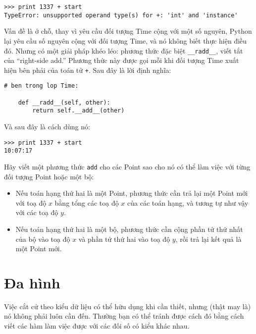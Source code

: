 \documentclass[11pt]{book}
\begin{document}

\beforeverb
\begin{verbatim}
>>> print 1337 + start
TypeError: unsupported operand type(s) for +: 'int' and 'instance'
\end{verbatim}
\afterverb
%
Vấn đề là ở chỗ, thay vì yêu cầu đối tượng  Time cộng với một số nguyên,
Python lại yêu cầu số nguyên cộng với đối tượng Time, và nó không biết 
thực hiện điều đó. Nhưng có một giải pháp khéo léo: 
phương thức đặc biệt \verb"__radd__", viết tắt của ``right-side add.''
Phương thức này được gọi mỗi khi đối tượng Time xuất hiện bên phải
của toán tử {\tt +}. Sau đây là lời định nghĩa:


\beforeverb
\begin{verbatim}
# ben trong lop Time:

    def __radd__(self, other):
        return self.__add__(other)
\end{verbatim}
\afterverb
%
Và sau đây là cách dùng nó:

\beforeverb
\begin{verbatim}
>>> print 1337 + start
10:07:17
\end{verbatim}
\afterverb
%

\begin{ex}
Hãy viết một phương thức {\tt add} cho các Point sao cho nó có thể làm
việc với từng đối tượng Point hoặc một bộ:  

\begin{itemize}

\item Nếu toán hạng thứ hai là một Point, phương thức cần trả lại một
Point mới với toạ độ $x$ bằng tổng các toạ độ $x$ của các toán hạng,
và tương tự như vậy với các toạ độ $y$.

\item Nếu toán hạng thứ hai là một bộ, phương thức cần cộng 
phần tử thứ nhất của bộ vào toạ độ $x$ và phần tử
thứ hai vào toạ độ $y$, rồi trả lại kết quả là một Point mới.

\end{itemize}

\end{ex}

\section{Đa hình}

Việc cắt cử theo kiểu dữ liệu có thể hữu dụng khi cần thiết, nhưng (thật may là) 
nó không phải luôn cần đến. Thường bạn có thể tránh được cách đó bằng cách
viết các hàm làm việc được với các đối số có kiểu khác nhau.
\end{document}

